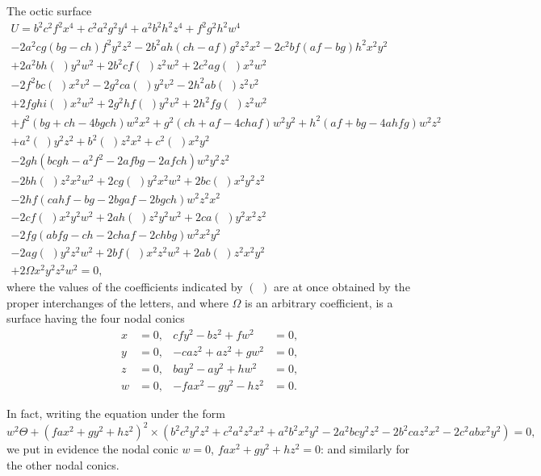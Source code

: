\documentclass[12pt,a4paper]{article}
\theoremstyle{plain}
\begin{document}
The octic surface
%
\begin{multline}
U = b^{2}c^{2}f^{2}x^{4} + c^{2}a^{2}g^{2}y^{4} + a^{2}b^{2}h^{2}z^{4} + f^{2}g^{2}h^{2}w^{4} \\
- 2a^{2}cg(bg - ch)f^{2}y^{2}z^{2} - 2b^{2}ah(ch - af)g^{2}z^{2}x^{2} - 2c^{2}bf(af - bg)h^{2}x^{2}y^{2} \\
+ 2a^{2}bh(\,\,)y^{2}w^{2} + 2b^{2}cf(\,\,)z^{2}w^{2} + 2c^{2}ag(\,\,)x^{2}w^{2} \\
- 2f^{2}bc(\,\,)x^{2}v^{2} - 2g^{2}ca(\,\,)y^{2}v^{2} - 2h^{2}ab(\,\,)z^{2}v^{2} \\
+ 2fghi(\,\,)x^{2}w^{2} + 2g^{2}hf(\,\,)y^{2}v^{2} + 2h^{2}fg(\,\,)z^{2}w^{2} \\
+ f^{2}(bg + ch - 4bgch)w^{2}x^{2} + g^{2}(ch + af - 4chaf)w^{2}y^{2} + h^{2}(af + bg - 4ahfg)w^{2}z^{2} \\
+ a^{2}(\,\,)y^{2}z^{2} + b^{2}(\,\,)z^{2}x^{2} + c^{2}(\,\,)x^{2}y^{2} \\
- 2gh(bcgh - a^{2}f^{2} - 2afbg - 2afch)w^{2}y^{2}z^{2} \\
- 2bh(\,\,)z^{2}x^{2}w^{2} + 2cg(\,\,)y^{2}x^{2}w^{2} + 2bc(\,\,)x^{2}y^{2}z^{2} \\
- 2hf(cahf - bg - 2bgaf - 2bgch)w^{2}z^{2}x^{2} \\
- 2cf(\,\,)x^{2}y^{2}w^{2} + 2ah(\,\,)z^{2}y^{2}w^{2} + 2ca(\,\,)y^{2}x^{2}z^{2} \\
- 2fg(abfg - ch - 2chaf - 2chbg)w^{2}x^{2}y^{2} \\
- 2ag(\,\,)y^{2}z^{2}w^{2} + 2bf(\,\,)x^{2}z^{2}w^{2} + 2ab(\,\,)z^{2}x^{2}y^{2} \\
+ 2\Omega x^{2}y^{2}z^{2}w^{2} = 0,
\end{multline}
%
where the values of the coefficients indicated by $(\,\,)$ are at once obtained by the proper interchanges of the letters, and where $\Omega$ is an arbitrary coefficient, is a surface having the four nodal conics
\begin{align*}
x&=0, & cf y^{2} - bz^{2} + fw^{2} &= 0, \\
y&=0, & -ca z^{2} + az^{2} + gw^{2} &= 0, \\
z&=0, & ba y^{2} - ay^{2} + hw^{2} &= 0, \\
w&=0, & -fax^{2} - gy^{2} - hz^{2} &= 0.
\end{align*}

\newpage
\setcounter{page}{103}

In fact, writing the equation under the form
\[
w^{2}\Theta + (fax^{2} + gy^{2} + hz^{2})^{2} \times (b^{2}c^{2}y^{2}z^{2} + c^{2}a^{2}z^{2}x^{2} + a^{2}b^{2}x^{2}y^{2} - 2a^{2}bc y^{2}z^{2} - 2b^{2}ca z^{2}x^{2} - 2c^{2}ab x^{2}y^{2}) = 0,
\]
we put in evidence the nodal conic $w = 0$, $fax^{2} + gy^{2} + hz^{2} = 0$: and similarly for the other nodal conics.
\end{document}
